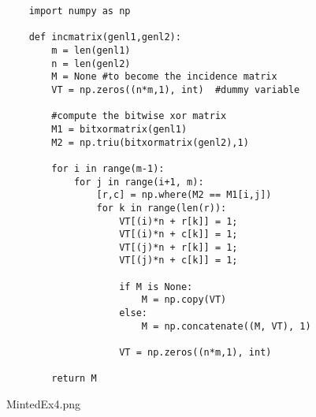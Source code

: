 \documentclass{article}
\begin{document}
\begin{verbatim}
    import numpy as np
     
    def incmatrix(genl1,genl2):
        m = len(genl1)
        n = len(genl2)
        M = None #to become the incidence matrix
        VT = np.zeros((n*m,1), int)  #dummy variable
     
        #compute the bitwise xor matrix
        M1 = bitxormatrix(genl1)
        M2 = np.triu(bitxormatrix(genl2),1) 
     
        for i in range(m-1):
            for j in range(i+1, m):
                [r,c] = np.where(M2 == M1[i,j])
                for k in range(len(r)):
                    VT[(i)*n + r[k]] = 1;
                    VT[(i)*n + c[k]] = 1;
                    VT[(j)*n + r[k]] = 1;
                    VT[(j)*n + c[k]] = 1;
     
                    if M is None:
                        M = np.copy(VT)
                    else:
                        M = np.concatenate((M, VT), 1)
     
                    VT = np.zeros((n*m,1), int)
     
        return M
    \end{verbatim}
    
    MintedEx4.png
    
\end{document}
